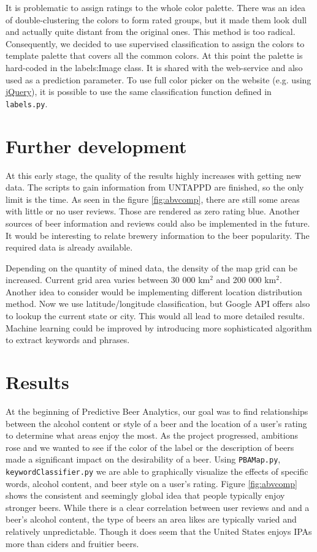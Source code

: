 \documentclass[10pt]{IEEEtran}
\begin{document}
It is problematic to assign ratings to the whole color palette. There was an idea of double-clustering the colors to form rated groups, but it made them look dull and actually quite distant from the original ones. This method is too radical. Consequently, we decided to use supervised classification to assign the colors to template palette that covers all the common colors. At this point the palette is hard-coded in the labels:Image class. It is shared with the web-service and also used as a prediction parameter. To use full color picker on the website (e.g. using  \href{http://jquery.com/}{jQuery}), it is possible to use the same classification function defined in \texttt{labels.py}.

\section{Further development}
At this early stage, the quality of the results highly increases with getting new data. The scripts to gain information from UNTAPPD are finished, so the only limit is the time. As seen in the figure \ref{fig:abvcomp}, there are still some areas with little or no user reviews. Those are rendered as zero rating blue. Another sources of beer information and reviews could also be implemented in the future. 
It would be interesting to relate brewery information to the beer popularity. The required data is already available.

Depending on the quantity of mined data, the density of the map grid can be increased. Current grid area varies between 30 000 km$^2$ and 200 000 km$^2$. Another idea to consider would be implementing different location distribution method. Now we use latitude/longitude classification, but Google API offers also to lookup the current state or city. This would all lead to more detailed results. Machine learning could be improved by introducing more sophisticated algorithm to extract keywords and phrases. 

\section{Results}
At the beginning of Predictive Beer Analytics, our goal was to find relationships between the alcohol content or style of a beer and the location of a user's rating to determine what areas enjoy the most. As the project progressed, ambitions rose and we wanted to see if the color of the label or the description of beers made a significant impact on the desirability of a beer. Using \texttt{PBAMap.py}, \texttt{keywordClassifier.py} we are able to graphically visualize the effects of specific words, alcohol content, and beer style on a user's rating. Figure \ref{fig:abvcomp} shows the consistent and seemingly global idea that people typically enjoy stronger beers. While there is a clear correlation between user reviews and and a beer's alcohol content, the type of beers an area likes are typically varied and relatively unpredictable. Though it does seem that the United States enjoys IPAs more than ciders and fruitier beers.
\end{document}
